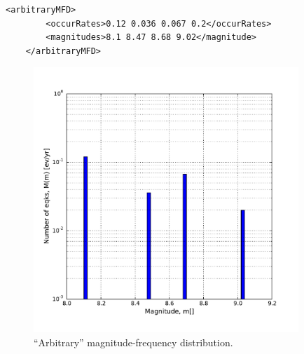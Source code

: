 \begin{description}
\begin{Verbatim}[frame=single, commandchars=\\\{\}, fontsize=\footnotesize]
    <arbitraryMFD>
        <occurRates>0.12 0.036 0.067 0.2</occurRates>
        <magnitudes>8.1 8.47 8.68 9.02</magnitude>
    </arbitraryMFD>
\end{Verbatim}

\begin{figure}[!ht]
\centering
\includegraphics[width=10cm]{figures/hazard/arb_mfd.pdf}
\caption{``Arbitrary'' magnitude-frequency distribution.}
\label{fig:arb_mfd}
\end{figure}
  

\end{description}
